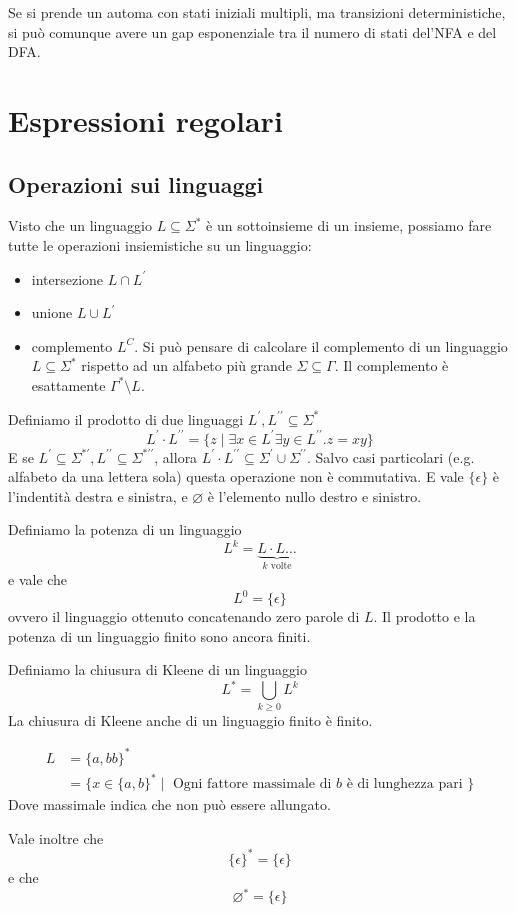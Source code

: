 \documentclass[12pt]{report}
\begin{document}
Se si prende un automa con stati iniziali multipli, ma transizioni deterministiche, si può comunque avere un gap esponenziale tra il numero di stati del'NFA e del DFA.

\chapter{Espressioni regolari}
\section{Operazioni sui linguaggi}
Visto che un linguaggio $L \subseteq \Sigma^*$ è un sottoinsieme di un insieme, possiamo fare tutte le operazioni insiemistiche su un linguaggio:
\begin{itemize}
	\item intersezione $L \cap L^\prime$
	\item unione $L \cup L^\prime$
	\item complemento $L^C$.
		Si può pensare di calcolare il complemento di un linguaggio $L \subseteq \Sigma^*$ rispetto ad un alfabeto più grande $\Sigma \subseteq \Gamma$.
		Il complemento è esattamente $\Gamma^* \setminus L$.
\end{itemize}

Definiamo il prodotto di due linguaggi $L^\prime, L^{\prime\prime} \subseteq \Sigma^*$
$$ L^\prime \cdot L^{\prime\prime} = \{ z \mid \exists x \in L^\prime \exists y \in L^{\prime\prime} . z = xy \} $$
E se $L^\prime \subseteq \Sigma^{*\prime}, L^{\prime\prime} \subseteq \Sigma^{*\prime\prime}$, allora $L^\prime \cdot L^{\prime\prime} \subseteq \Sigma^\prime \cup \Sigma^{\prime\prime}$.
Salvo casi particolari (e.g. alfabeto da una lettera sola) questa operazione non è commutativa.
E vale $\{ \epsilon \}$ è l'indentità destra e sinistra, e $\varnothing$ è l'elemento nullo destro e sinistro.

Definiamo la potenza di un linguaggio
$$ L^k = \underbrace{L \cdot L \dots}_{k \text{ volte}} $$
e vale che 
$$ L^0 = \{ \epsilon \} $$
ovvero il linguaggio ottenuto concatenando zero parole di $L$.
Il prodotto e la potenza di un linguaggio finito sono ancora finiti.

Definiamo la chiusura di Kleene di un linguaggio
$$ L^* = \bigcup_{k \geq 0} L^k $$
La chiusura di Kleene anche di un linguaggio finito è finito.
\begin{tcolorbox}
	\begin{align*}
		L &= \{ a, bb\}^* \\
		  & = \{ x \in \{a, b\}^* \mid \text{ Ogni fattore massimale di $b$ è di lunghezza pari }\}
	\end{align*}
	Dove massimale indica che non può essere allungato.
\end{tcolorbox}
Vale inoltre che
$$ \{\epsilon \}^* = \{ \epsilon \}$$
e che
$$ \varnothing^* = \{ \epsilon \} $$
\end{document}
